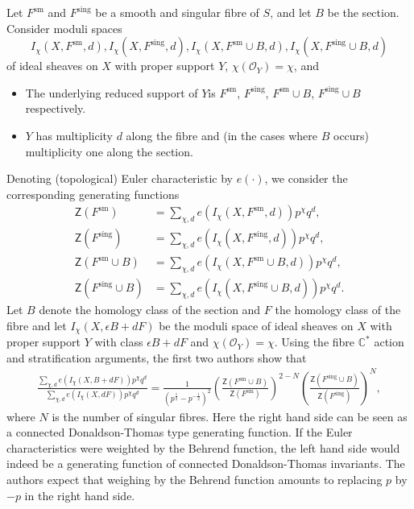 \documentclass{amsart}
\theoremstyle{definition}
\newcommand{\CC} {\mathbb{C}}          %
\renewcommand{\O}{\mathcal{O}}
\newcommand{\sm}{\mathrm{sm}}
\newcommand{\sing}{\mathrm{sing}}
\newcommand{\sfZ} {\mathsf{Z}}
\begin{document}
Let $F^{\sm}$ and $F^{\sing}$ be a smooth and singular fibre of $S$, and let $B$ be the section. Consider moduli spaces 
$$
I_\chi(X,F^{\sm},d), I_\chi(X,F^{\sing},d), I_\chi(X,F^{\sm} \cup B,d), I_\chi(X,F^{\sing} \cup B,d) 
$$
of ideal sheaves on $X$ with proper support $Y$, $\chi(\O_Y) = \chi$, and 
\begin{itemize}
\item The underlying reduced support of $Y$is $F^{\sm}$, $F^{\sing}$, $F^{\sm} \cup B$, $F^{\sing} \cup B$ respectively. 
\item $Y$ has multiplicity $d$ along the fibre and (in the cases where $B$ occurs) multiplicity one along the section. 
\end{itemize}
Denoting (topological) Euler characteristic by $e(\cdot)$, we consider the corresponding generating functions
\begin{align*}
\sfZ(F^{\sm}) &= \sum_{\chi, d} e(I_\chi(X,F^{\sm},d)) p^\chi q^d, \\
\sfZ(F^{\sing}) &= \sum_{\chi, d} e(I_\chi(X,F^{\sing},d)) p^\chi q^d, \\
\sfZ(F^{\sm} \cup B) &= \sum_{\chi, d} e(I_\chi(X,F^{\sm} \cup B,d)) p^\chi q^d, \\
\sfZ(F^{\sing} \cup B) &= \sum_{\chi, d} e(I_\chi(X,F^{\sing} \cup B,d)) p^\chi q^d.
\end{align*}
Let $B$ denote the homology class of the section and $F$ the homology class of the fibre and let $I_\chi(X,\epsilon B+dF)$ be the moduli space of ideal sheaves on $X$ with proper support $Y$ with class $\epsilon B+dF$ and $\chi(\O_Y) = \chi$. Using the fibre $\CC^*$ action and stratification arguments, the first two authors show that \cite{BK} 
\begin{align} \label{BK}
\frac{\sum_{\chi, d} e(I_\chi(X,B+dF)) p^\chi q^d}{\sum_{\chi, d} e(I_\chi(X,dF)) p^\chi q^d} = \frac{1}{(p^{\frac{1}{2}}-p^{-\frac{1}{2}})^2} \left( \frac{\sfZ(F^{\sm} \cup B)}{\sfZ(F^{\sm})} \right)^{2-N} \left( \frac{\sfZ(F^{\sing} \cup B)}{\sfZ(F^{\sing})} \right)^N,
\end{align}
where $N$ is the number of singular fibres. Here the right hand side can be seen as a connected Donaldson-Thomas type generating function. If the Euler characteristics were weighted by the Behrend function, the left hand side would indeed be a generating function of connected Donaldson-Thomas invariants. The authors expect that weighing by the Behrend function amounts to replacing $p$ by $-p$ in the right hand side. 
\end{document}
